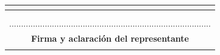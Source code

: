 \documentclass[5pt]{report}
\begin{document}
	 	\begin{adjustbox}{width=\textwidth}
	 		\centering
	 		\begin{tabular} {| c | c | c | c |}
	 			\multicolumn{4}{c}{  }\\
		 		\hline
	 			\multicolumn {4}{|c|}{  }\\

	 			\multicolumn {4}{|c|}{  }\\
	 			\multicolumn {4}{|c|}{.....................................................................................}\\	 	\multicolumn{4}{|c|}{\large{\textbf{Firma y aclaración del representante}}}\\
	 			\multicolumn {4}{|c|}{  }\\
	 			\hline
	 		\end{tabular}
	 	\end{adjustbox}
\end{document}
